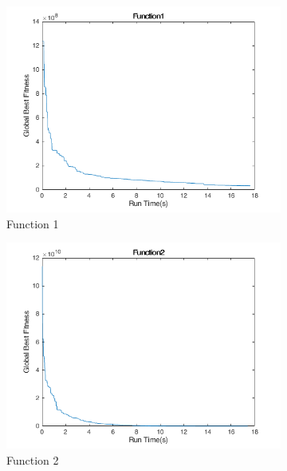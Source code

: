 \clearpage

\begin{figure}
  \begin{subfigure}[b]{0.4\textwidth}
    \includegraphics[width=\textwidth]{img/cecrt/f1}
    \caption{Function 1}
  \end{subfigure}
  \begin{subfigure}[b]{0.4\textwidth}
    \includegraphics[width=\textwidth]{img/cecrt/f2}
    \caption{Function 2}
  \end{subfigure}
  \begin{subfigure}[b]{0.4\textwidth}

\end{subfigure}
\end{figure}
